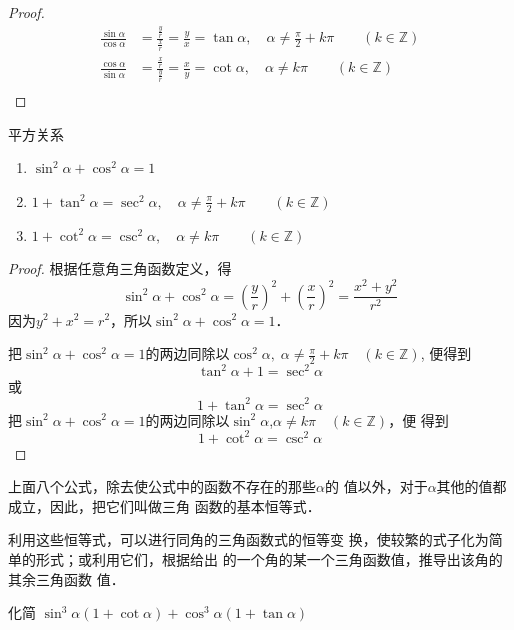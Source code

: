 \begin{proof}
\[\begin{split}
    \frac{\sin\alpha}{\cos\alpha}&=\frac{\frac{y}{r}}{\frac{x}{r}}=\frac{y}{x}=\tan\alpha,\quad \alpha\ne\frac{\pi}{2}+k\pi\qquad (k\in\mathbb{Z})\\
    \frac{\cos\alpha}{\sin\alpha}&=\frac{\frac{x}{r}}{\frac{y}{r}}=\frac{x}{y}=\cot\alpha,\quad \alpha\ne k\pi\qquad (k\in\mathbb{Z})\\
\end{split}\]    
\end{proof}


\begin{blk}{平方关系}
\begin{enumerate}
    \item $\sin^2\alpha+\cos^2\alpha=1$
    \item $1+\tan^2\alpha=\sec^2\alpha,\quad \alpha\ne \frac{\pi}{2}+k\pi\qquad  (k\in\mathbb{Z})$
    \item $1+\cot^2\alpha=\csc^2\alpha,\quad \alpha\ne k\pi \qquad (k\in\mathbb{Z})$
\end{enumerate}
\end{blk}

\begin{proof}
    根据任意角三角函数定义，得
\[\sin^2\alpha+\cos^2\alpha=\left(\frac{y}{r}\right)^2+\left(\frac{x}{r}\right)^2=\frac{x^2+y^2}{r^2}\]
因为$y^2+x^2=r^2$，所以$\sin^2\alpha+\cos^2\alpha=1$．

把$\sin^2\alpha+\cos^2\alpha=1$的两边同除以$\cos^2\alpha,\;\alpha\ne\frac{\pi}{2}+k\pi\quad (k\in\mathbb{Z})$, 便得到
\[\tan^2\alpha+1=\sec^2\alpha\]
或
\[1+\tan^2\alpha=\sec^2\alpha\]
把$\sin^2\alpha+\cos^2\alpha=1$的两边同除以$\sin^2\alpha$,$\alpha\ne k\pi\quad (k\in\mathbb{Z})$，便
得到
\[1+\cot^2\alpha =\csc^2\alpha\]
\end{proof}


上面八个公式，除去使公式中的函数不存在的那些$\alpha$的
值以外，对于$\alpha$其他的值都成立，因此，把它们叫做三角
函数的基本恒等式．

利用这些恒等式，可以进行同角的三角函数式的恒等变
换，使较繁的式子化为简单的形式；或利用它们，根据给出
的一个角的某一个三角函数值，推导出该角的其余三角函数
值．




\begin{example}
    化简 $\sin ^{3} \alpha(1+\cot \alpha)+\cos ^{3} \alpha(1+\tan \alpha)$
\end{example}

